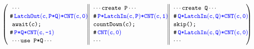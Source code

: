 \begin{center}
  \begin{small}
 \\
 \\
\\\vspace{-12pt}
\[
\left(
\begin{tabular}{ 
  l@{\extracolsep{\fill}} || 
  l@{\extracolsep{\fill}} || 
  l@{\extracolsep{\fill}} }
\code{\dotonly{}} & \code{\dotsaying{create P}} & \code{\dotsaying{create Q}} \\
\!\!\code{\CSPEC{\!\!\LatchOut{c}{P{\sep}Q}{\sep}\CNT{c}{0}}}
&\code{\CSPEC{\!\!P{\sep}\LatchIn{c}{P}{\sep}\CNT{c}{1}}} 
& \code{\CSPEC{\!\!Q{\sep}\LatchIn{c}{Q}{\sep}\CNT{c}{0}}} \\
\code{await(c);} & \code{countDown(c);} & \code{skip();}\\
\!\!\code{\CSPEC{\!\!{P{\sep}Q{\sep}\CNT{c}{-1}}}}
& \code{\CSPEC{\!\!\CNT{c}{0}}} 
& \code{\CSPEC{\!\!Q{\sep}\LatchIn{c}{Q}{\sep}\CNT{c}{0}}} \\
\code{\dotsaying{use P*Q}} & \code{\dotonly{}} & \code{\dotonly{}} \\
\end{tabular}\!\!\right)%
\]

 \\
 \\

\end{small}
\end{center}
